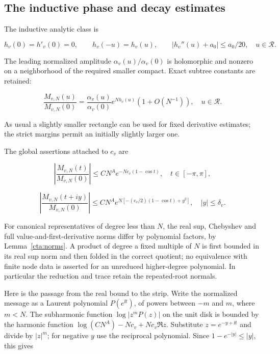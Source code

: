 \subsection{The inductive phase and decay estimates}\label{dt:sec-4}

The inductive analytic class is

\begin{equation}\label{dt:eq-27}
h_v(0)=h'_v(0)=0,\qquad h_v(-u)=h_v(u),\qquad
 |h_v''(u)+a_0|\le a_0/20,\quad u\in\mathcal R.
\end{equation}

The leading normalized amplitude \(\alpha_v(u)/\alpha_v(0)\) is holomorphic
and nonzero on a neighborhood of the required smaller compact. Exact
subtree constants are retained:

\begin{equation}\label{dt:eq-28}
\frac{M_{v,N}(u)}{M_{v,N}(0)}
 =\frac{\alpha_v(u)}{\alpha_v(0)}e^{Nh_v(u)}(1+O(N^{-1})),
                     \quad u\in\mathcal R.
\end{equation}

As usual a slightly smaller rectangle can be used for fixed derivative
estimates; the strict margins permit an initially slightly larger one.

The global assertions attached to \(c_v\) are

\begin{equation}\label{dt:eq-29}
\left|\frac{M_{v,N}(t)}{M_{v,N}(0)}\right|
          \le CN^A e^{-Nc_v(1-\cos t)},
                         \quad t\in[-\pi,\pi],
\end{equation}

\begin{equation}\label{dt:eq-30}
\left|\frac{M_{v,N}(t+iy)}{M_{v,N}(0)}\right|
 \le CN^A e^{N[-(c_v/2)(1-\cos t)+y^2]},
                      \quad |y|\le\delta_v.
\end{equation}

For canonical representatives of degree less than \(N\), the real sup,
Chebyshev and full value-and-first-derivative norms differ by polynomial
factors, by Lemma~\ref{cta:norms}. A product of degree a fixed multiple
of \(N\) is first bounded in its real sup norm and then folded in the
correct quotient; no equivalence with finite node data is asserted for
an unreduced higher-degree polynomial. In particular the reduction and
trace retain the repeated-root normals.

Here is the passage from the real bound to the strip. Write the
normalized message as a Laurent polynomial \(P(e^{\ii t})\), of powers
between \(-m\) and \(m\), where \(m<N\). The subharmonic function
\(\log|z^mP(z)|\) on the unit disk is bounded by the harmonic
function \(\log(CN^A)-Nc_v+Nc_v\Re z\). Substitute
\(z=e^{-y+\ii t}\) and divide by \(|z|^m\); for negative \(y\)
use the reciprocal polynomial. Since \(1-e^{-|y|}\le|y|\), this gives

